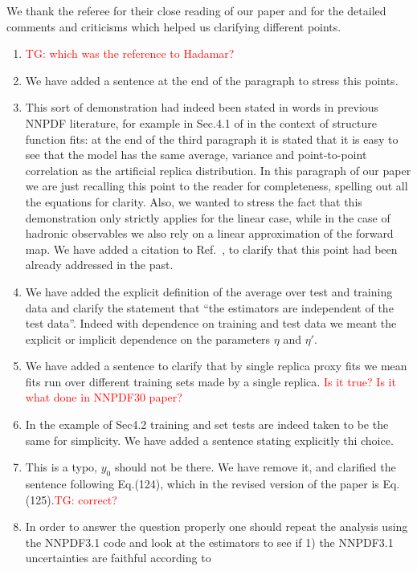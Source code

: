\documentclass[11pt,a4paper]{article}
\numberwithin{equation}{section}
\numberwithin{figure}{section}
\numberwithin{table}{section}
\begin{document}
We thank the referee for their close reading of our paper and for the detailed comments and criticisms 
which helped us clarifying different points.
\begin{enumerate}
    \item \textcolor{red}{TG: which was the reference to Hadamar?}
    \item We have added a sentence at the end of the paragraph to stress this points.
    \item This sort of demonstration had indeed been stated in words in previous NNPDF literature,
    for example in Sec.4.1 of \cite{Forte:2002fg} in the context of structure function fits:
    at the end of the third paragraph it is stated that it is easy to see that
    the model has the same average, variance and point-to-point correlation
    as the artificial replica distribution. In this paragraph of our paper
    we are just recalling this point to the reader for completeness, spelling out all the equations for clarity.
    Also, we wanted to stress the fact that this demonstration only strictly applies for the linear case,
    while in the case of hadronic observables we also rely on a linear approximation of the 
    forward map. We have added a citation to Ref.~\cite{Forte:2002fg}, to clarify that this point
    had been already addressed in the past.
    \item We have added the explicit definition of the average over test and training data and 
    clarify the statement that ``the estimators are independent of the test data''. Indeed with dependence
    on training and test data we meant the explicit or implicit dependence on the parameters $\eta$ and $\eta'$.
    \item We have added a sentence to clarify that by single replica proxy fits we mean fits
    run over different training sets made by a single replica. \textcolor{red}{Is it true? Is it what done in NNPDF30
    paper?}
    \item In the example of Sec4.2 training and set tests are indeed taken to be the same for simplicity.
    We have added a sentence stating explicitly thi choice.
    \item This is a typo, $y_0$ should not be there. We have remove it, and clarified the sentence following Eq.(124),
    which in the revised version of the paper is Eq.(125).\textcolor{red}{TG: correct?}
    \item In order to answer the question properly one should repeat the analysis using the 
    NNPDF3.1 code and look at the estimators to see if 1) the NNPDF3.1 uncertainties are faithful according to 

\end{enumerate}
\end{document}
